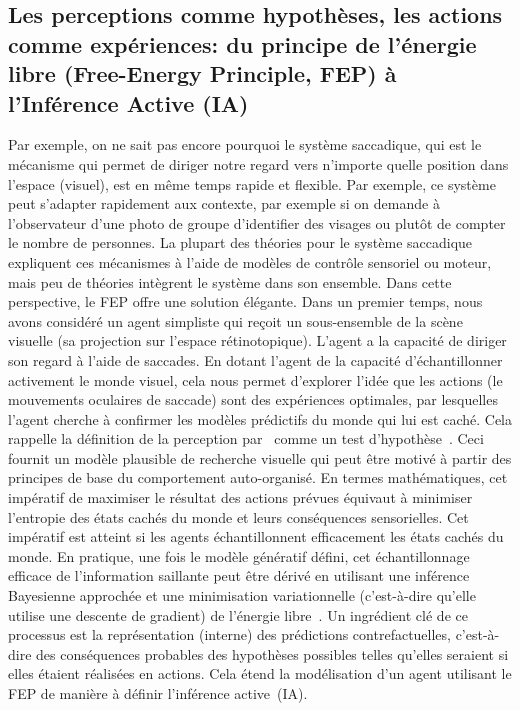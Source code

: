 \subsection{Les perceptions comme hypothèses, les actions comme expériences: du principe de
l'énergie libre (Free-Energy Principle, FEP) à l'Inférence Active (IA)}
Par exemple, on ne sait pas encore pourquoi le système saccadique, qui est le mécanisme qui
permet de diriger notre regard vers n'importe quelle position dans l'espace
(visuel), est en même temps rapide et flexible. Par
exemple, ce système peut s'adapter rapidement aux contexte,
par exemple si on demande à l'observateur d'une photo de groupe d'identifier des visages ou plutôt de compter le nombre de personnes. La plupart des théories pour le système saccadique expliquent ces mécanismes à l'aide de
modèles de contrôle sensoriel ou moteur, mais peu de théories intègrent
le système dans son ensemble. Dans cette perspective, le FEP offre une
solution élégante. Dans un premier temps, nous avons considéré un agent
simpliste qui reçoit un sous-ensemble de la scène visuelle (sa
projection sur l'espace rétinotopique). L'agent a la capacité de diriger
son regard à l'aide de saccades. En dotant l'agent de la capacité
d'échantillonner activement le monde visuel, cela nous permet d'explorer
l'idée que les actions (le mouvements oculaires de saccade) sont des
expériences optimales, par lesquelles l'agent cherche à confirmer les
modèles prédictifs du monde qui lui est caché. Cela rappelle la définition de la
perception par~\citet{vonHelmholtz1867} comme un test d'hypothèse~\citep{Gregory80}. Ceci fournit un modèle plausible de recherche visuelle
qui peut être motivé à partir des principes de base du comportement
auto-organisé. En termes mathématiques, cet impératif de maximiser le
résultat des actions prévues équivaut à minimiser l'entropie des états
cachés du monde et leurs conséquences sensorielles. Cet impératif est
atteint si les agents échantillonnent efficacement les états cachés du
monde. En pratique, une fois le modèle génératif défini, cet
échantillonnage efficace de l'information saillante peut être dérivé en
utilisant une inférence Bayesienne approchée et une minimisation
variationnelle (c'est-à-dire qu'elle utilise une descente de gradient) de l'énergie libre~\citep{Friston10}. Un ingrédient clé
de ce processus est la représentation (interne) des prédictions
contrefactuelles, c'est-à-dire des conséquences probables des hypothèses
possibles telles qu'elles seraient si elles étaient réalisées en actions.
Cela étend
la modélisation d'un agent utilisant le FEP de manière à définir l'inférence
active~(IA).

